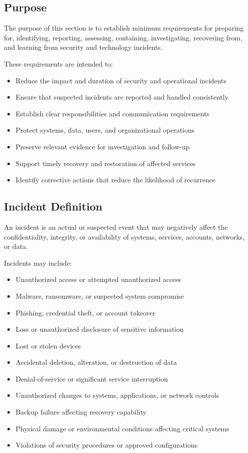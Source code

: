 \subsection{Purpose}

The purpose of this section is to establish minimum requirements for preparing for, identifying, reporting, assessing, containing, investigating, recovering from, and learning from security and technology incidents.

These requirements are intended to:
\begin{itemize}
    \item Reduce the impact and duration of security and operational incidents
    \item Ensure that suspected incidents are reported and handled consistently
    \item Establish clear responsibilities and communication requirements
    \item Protect systems, data, users, and organizational operations
    \item Preserve relevant evidence for investigation and follow-up
    \item Support timely recovery and restoration of affected services
    \item Identify corrective actions that reduce the likelihood of recurrence
\end{itemize}

\subsection{Incident Definition}

An incident is an actual or suspected event that may negatively affect the confidentiality, integrity, or availability of systems, services, accounts, networks, or data.

Incidents may include:
\begin{itemize}
    \item Unauthorized access or attempted unauthorized access
    \item Malware, ransomware, or suspected system compromise
    \item Phishing, credential theft, or account takeover
    \item Loss or unauthorized disclosure of sensitive information
    \item Lost or stolen devices
    \item Accidental deletion, alteration, or destruction of data
    \item Denial-of-service or significant service interruption
    \item Unauthorized changes to systems, applications, or network controls
    \item Backup failure affecting recovery capability
    \item Physical damage or environmental conditions affecting critical systems
    \item Violations of security procedures or approved configurations
\end{itemize}

